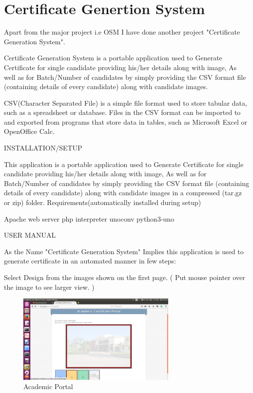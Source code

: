 \section{Certificate Genertion System}

Apart from the major project i.e OSM I have done another project "Certificate Generation System".

Certificate Generation System is a portable application used to Generate Certificate for single candidate providing his/her details along with image,
As well as for Batch/Number of candidates by simply providing the CSV format file (containing details of every candidate) along with candidate images.

CSV(Character Separated File) is a simple file format used to store tabular data, such as a spreadsheet or database. Files in the CSV format can be imported to and exported from programs that store data in tables, such as Microsoft Excel or OpenOffice Calc.

INSTALLATION/SETUP

This application is a portable application used to Generate Certificate for single candidate providing his/her details along with image,
As well as for Batch/Number of candidates by simply providing the CSV format file (containing details of every candidate) along with candidate images in a compressed (tar.gz or zip) folder.
Requirements(automatically installed during setup)

    Apache web server
    php interpreter
    unoconv
    python3-uno

USER MANUAL

As the Name "Certificate Generation System" Implies this application is used to generate certificate in an automated manner in few steps:

    Select Design from the images shown on the first page. ( Put mouse pointer over the image to see larger view. )

\begin{figure}[!ht]
\centering
\includegraphics[width=0.7\textwidth]{input/images/cgs/cgs1.png}
\caption{Academic Portal}
\hspace{-1.5em}
\end{figure}


